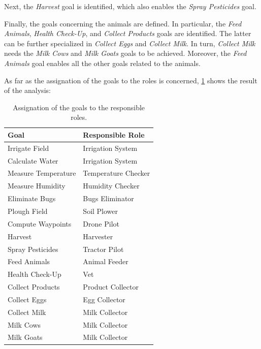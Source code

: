 Next, the \textit{Harvest} goal is identified, which also enables the \textit{Spray Pesticides} goal.

Finally, the goals concerning the animals are defined.
In particular, the \textit{Feed Animals}, \textit{Health Check-Up}, and \textit{Collect Products} goals are identified.
The latter can be further specialized in \textit{Collect Eggs} and \textit{Collect Milk}.
In turn, \textit{Collect Milk} needs the \textit{Milk Cows} and \textit{Milk Goats} goals to be achieved.
Moreover, the \textit{Feed Animals} goal enables all the other goals related to the animals.

As far as the assignation of the goals to the roles is concerned, \cref{tab:goal-assignation} shows the result of the analysis:

\begin{table}[H]
    \centering
    \begin{tabular}{| l | l |}
        \hline
        \textbf{Goal} & \textbf{Responsible Role} \\
        \hline
        Irrigate Field & Irrigation System \\
        Calculate Water & Irrigation System \\
        Measure Temperature & Temperature Checker \\
        Measure Humidity & Humidity Checker \\
        Eliminate Bugs & Bugs Eliminator \\
        Plough Field & Soil Plower \\
        Compute Waypoints & Drone Pilot \\
        Harvest & Harvester \\
        Spray Pesticides & Tractor Pilot \\
        Feed Animals & Animal Feeder \\
        Health Check-Up & Vet \\
        Collect Products & Product Collector \\
        Collect Eggs & Egg Collector \\
        Collect Milk & Milk Collector \\
        Milk Cows & Milk Collector \\
        Milk Goats & Milk Collector \\
        \hline
    \end{tabular}
    \caption{Assignation of the goals to the responsible roles.}
    \label{tab:goal-assignation}
\end{table}

